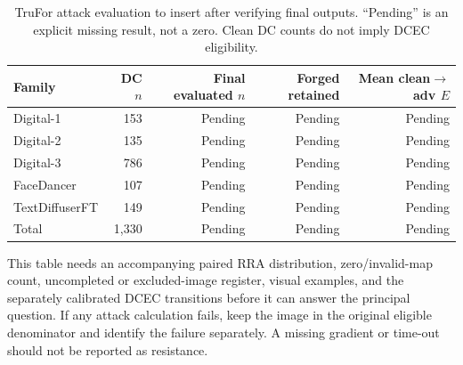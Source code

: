 \begin{table}[htbp]
\centering\small
\caption{TruFor attack evaluation to insert after verifying final outputs. ``Pending'' is an explicit missing result, not a zero. Clean DC counts do not imply DCEC eligibility.}
\label{tab:app-adv-trufor-fill}
\begin{tabular}{@{}lrrrr@{}}
\toprule
Family & DC $n$ & Final evaluated $n$ & Forged retained & Mean clean$\rightarrow$adv $E$ \\
\midrule
Digital-1 & 153 & Pending & Pending & Pending \\
Digital-2 & 135 & Pending & Pending & Pending \\
Digital-3 & 786 & Pending & Pending & Pending \\
FaceDancer & 107 & Pending & Pending & Pending \\
TextDiffuserFT & 149 & Pending & Pending & Pending \\
\midrule
Total & 1,330 & Pending & Pending & Pending \\
\bottomrule
\end{tabular}
\end{table}

This table needs an accompanying paired RRA distribution, zero/invalid-map count, uncompleted or excluded-image register, visual examples, and the separately calibrated DCEC transitions before it can answer the principal question. If any attack calculation fails, keep the image in the original eligible denominator and identify the failure separately. A missing gradient or time-out should not be reported as resistance.

